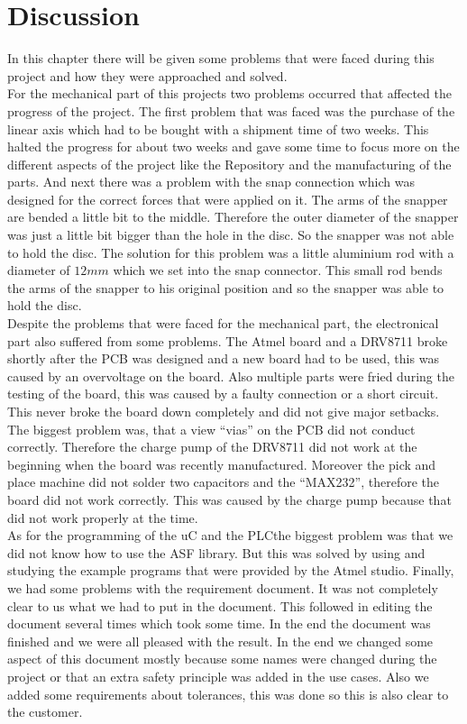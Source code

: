 \documentclass[a4paper,12pt]{scrreprt}
\begin{document}
\chapter{Discussion}

In this chapter there will be given some problems that were faced during this project and how they were approached and solved.\\
For the mechanical part of this projects two problems occurred that affected the progress of the project. The first problem that was faced was the purchase of the linear axis which had to be bought with a shipment time of two weeks. This halted the progress for about two weeks and gave some time to focus more on the different aspects of the project like the \acs{Repository} and the manufacturing of the parts. And next there was a problem with the snap connection which was designed for the correct forces that were applied on it. The arms of the snapper are bended a little bit to the middle. Therefore the outer diameter of the snapper was just a little bit bigger than the hole in the disc. So the snapper was not able to hold the disc. The solution for this problem was a little aluminium rod with a diameter of $12mm$ which we set into the snap connector. This small rod bends the arms of the snapper to his original position and so the snapper was able to hold the disc.\\
Despite the problems that were faced for the mechanical part, the electronical part also suffered from some problems. The Atmel board and a DRV8711 broke shortly after the PCB was designed and a new board had to be used, this was caused by an overvoltage on the board. Also multiple parts were fried during the testing of the board, this was caused by a faulty connection or a short circuit. This never broke the board down completely and did not give major setbacks. The biggest problem was, that a view “vias” on the PCB did not conduct correctly. Therefore the charge pump of the DRV8711 did not work at the beginning when the board was recently manufactured. Moreover the pick and place machine did not solder two capacitors and the \enquote{MAX232}, therefore the board did not work correctly. This was caused by the charge pump because that did not work properly at the time.\\
As for the programming of the \acs{uC} and the \acs{PLC}the biggest problem was that we did not know how to use the \acs{ASF} library. But this was solved by using and studying the example programs that were provided by the Atmel studio.
Finally, we had some problems with the requirement document. It was not completely clear to us what we had to put in the document. This followed in editing the document several times which took some time. In the end the document was finished and we were all pleased with the result. In the end we changed some aspect of this document mostly because some names were changed during the project or that an extra safety principle was added in the use cases. Also we added some requirements about tolerances, this was done so this is also clear to the customer.
\end{document}

